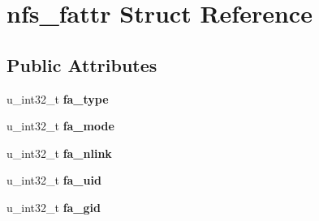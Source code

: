 \hypertarget{structnfs__fattr}{
\section{nfs\_\-fattr Struct Reference}
\label{structnfs__fattr}
}
\subsection*{Public Attributes}
\begin{DoxyCompactItemize}
\item 
\hypertarget{structnfs__fattr_a63af5ab1538005c27f774274db72aeb5}{
u\_\-int32\_\-t {\bfseries fa\_\-type}}
\label{structnfs__fattr_a63af5ab1538005c27f774274db72aeb5}

\item 
\hypertarget{structnfs__fattr_a9d68a583c23fa25d19b01d4196f51fd2}{
u\_\-int32\_\-t {\bfseries fa\_\-mode}}
\label{structnfs__fattr_a9d68a583c23fa25d19b01d4196f51fd2}

\item 
\hypertarget{structnfs__fattr_a06749fd2d8de16c5253f5a63d147524b}{
u\_\-int32\_\-t {\bfseries fa\_\-nlink}}
\label{structnfs__fattr_a06749fd2d8de16c5253f5a63d147524b}

\item 
\hypertarget{structnfs__fattr_a5b2b31969339f9cd59c32eaed18e0f08}{
u\_\-int32\_\-t {\bfseries fa\_\-uid}}
\label{structnfs__fattr_a5b2b31969339f9cd59c32eaed18e0f08}

\item 
\hypertarget{structnfs__fattr_ad6596221507c9f507a58ba953655c8ac}{
u\_\-int32\_\-t {\bfseries fa\_\-gid}}
\label{structnfs__fattr_ad6596221507c9f507a58ba953655c8ac}


\end{DoxyCompactItemize}
